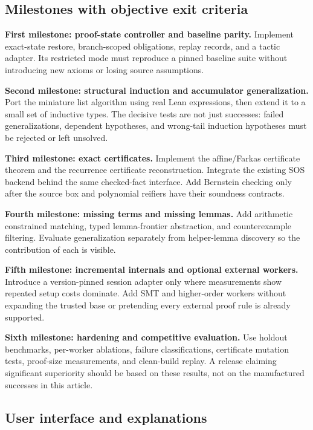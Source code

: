 \subsection{Milestones with objective exit criteria}

\textbf{First milestone: proof-state controller and baseline parity.}
Implement exact-state restore, branch-scoped obligations, replay records, and
a \Grind{} tactic adapter. Its restricted mode must reproduce a pinned baseline
suite without introducing new axioms or losing source assumptions.

\textbf{Second milestone: structural induction and accumulator generalization.}
Port the miniature list algorithm using real Lean expressions, then extend it
to a small set of inductive types. The decisive tests are not just successes:
failed generalizations, dependent hypotheses, and wrong-tail induction
hypotheses must be rejected or left unsolved.

\textbf{Third milestone: exact certificates.}
Implement the affine/Farkas certificate theorem and the recurrence certificate
reconstruction. Integrate the existing SOS backend behind the same checked-fact
interface. Add Bernstein checking only after the source box and polynomial
reifiers have their soundness contracts.

\textbf{Fourth milestone: missing terms and missing lemmas.}
Add arithmetic constrained matching, typed lemma-frontier abstraction, and
counterexample filtering. Evaluate generalization separately from helper-lemma
discovery so the contribution of each is visible.

\textbf{Fifth milestone: incremental internals and optional external workers.}
Introduce a version-pinned \Grind{} session adapter only where measurements
show repeated setup costs dominate. Add SMT and higher-order workers without
expanding the trusted base or pretending every external proof rule is already
supported.

\textbf{Sixth milestone: hardening and competitive evaluation.}
Use holdout benchmarks, per-worker ablations, failure classifications,
certificate mutation tests, proof-size measurements, and clean-build replay.
A release claiming significant superiority should be based on these results,
not on the manufactured successes in this article.

\subsection{User interface and explanations}

